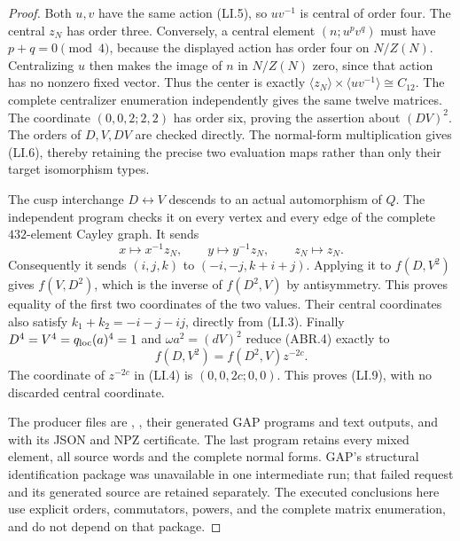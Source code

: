 \begin{proof}
Both $u,v$ have the same action (LI.5), so $uv^{-1}$
is central of order four.  The central $z_N$ has order three.
Conversely, a central element $(n;u^pv^q)$ must have
$p+q=0\pmod4$, because the displayed action has order four
on $N/Z(N)$.  Centralizing $u$ then makes the image of $n$
in $N/Z(N)$ zero, since that action has no nonzero fixed
vector.  Thus the center is exactly
$\langle z_N\rangle\times\langle uv^{-1}\rangle\cong C_{12}$.
The complete centralizer enumeration independently gives
the same twelve matrices.  The coordinate
$(0,0,2;2,2)$ has order six, proving the assertion about
$(DV)^2$.  The orders of $D,V,DV$ are checked directly.
The normal-form multiplication gives (LI.6), thereby retaining
the precise two evaluation maps rather than only their target
isomorphism types.

The cusp interchange $D\leftrightarrow V$ descends to an
actual automorphism of $Q$.  The independent program checks it
on every vertex and every edge of the complete $432$-element
Cayley graph.  It sends
\[
 x\mapsto x^{-1}z_N,\qquad y\mapsto y^{-1}z_N,
                 \qquad z_N\mapsto z_N.                \tag{LI.10}
\]
Consequently it sends $(i,j,k)$ to $(-i,-j,k+i+j)$.
Applying it to $f(D,V^2)$ gives $f(V,D^2)$, which is the
inverse of $f(D^2,V)$ by antisymmetry.  This proves equality
of the first two coordinates of the two values.  Their
central coordinates also satisfy
$k_1+k_2=-i-j-ij$, directly from (LI.3).
Finally $D^4=V^4=q_{\rm loc}(a)^4=1$ and
$\omega a^2=(dV)^2$ reduce (ABR.4) exactly to
\[
                  f(D,V^2)=f(D^2,V)z^{-2c}.
                                                               \tag{LI.11}
\]
The coordinate of $z^{-2c}$ in (LI.4) is
$(0,0,2c;0,0)$.  This proves (LI.9), with no discarded
central coordinate.

The producer files are
,
, their generated GAP
programs and text outputs, and
 with its JSON and NPZ
certificate.  The last program retains every mixed element,
all source words and the complete normal forms.  GAP's
structural identification package was unavailable in one
intermediate run; that failed request and its generated source
are retained separately.  The executed conclusions here use
explicit orders, commutators, powers, and the complete matrix
enumeration, and do not depend on that package.
\end{proof}

